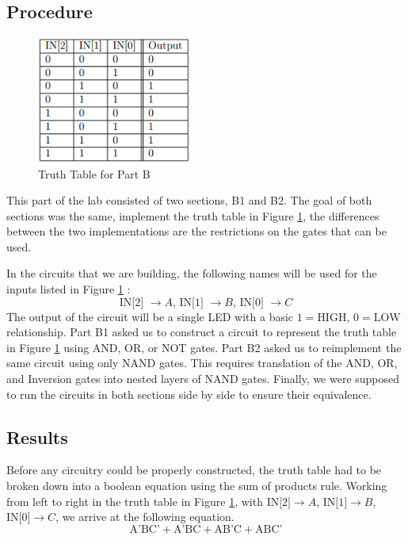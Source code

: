 \documentclass[a4paper,11pt]{article}
\begin{document}
\subsection{Procedure}

\begin{figure}
   \includegraphics[width=2in]{PartBTT}
   \caption{Truth Table for Part B}
   \label{fig:partbtt}
\end{figure} 

This part of the lab consisted of two sections, B1 and B2. The goal of both sections was the same, implement the truth table in Figure \ref{fig:partbtt}, the differences between the two implementations are the restrictions on the gates that can be used. \par
In the circuits that we are building, the following names will be used for the inputs listed in Figure \ref{fig:partbtt} : 
\[ \text{IN[2] $\to A$, IN[1] $\to B$, IN[0] $\to C$} \] 
The output of the circuit will be a single LED with a basic $1 = \text{HIGH}$, $0 = \text{LOW}$ relationship. Part B1 asked us to construct a circuit to represent the truth table in Figure \ref{fig:partbtt} using AND, OR, or NOT gates. Part B2 asked us to reimplement the same circuit using only NAND gates. This requires translation of the AND, OR, and Inversion gates into nested layers of NAND gates. Finally, we were supposed to run the circuits in both sections side by side to ensure their equivalence. 

\subsection{Results}
Before any circuitry could be properly constructed, the truth table had to be broken down into a boolean equation using the sum of products rule. Working from left to right in the truth table in Figure \ref{fig:partbtt}, with $\text{IN[2]} \to A$, $\text{IN[1]} \to B$, $\text{IN[0]} \to C$, we arrive at the following equation.
 \begin{equation}\label{eq:one} \text{A'BC'} + \text{A'BC} + \text{AB'C} + \text{ABC'} \end{equation}
\end{document}
